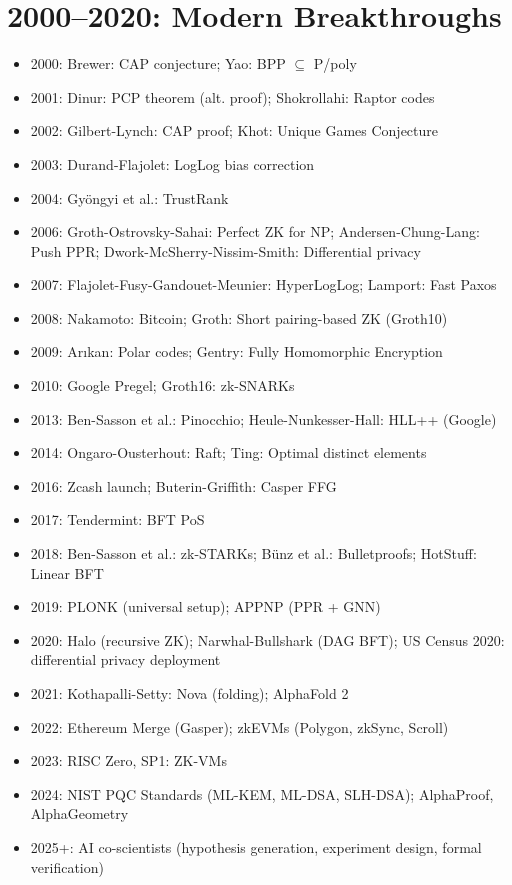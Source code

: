 \section{2000--2020: Modern Breakthroughs}
\begin{itemize}
\item 2000: Brewer: CAP conjecture; Yao: BPP $\subseteq$ P/poly
\item 2001: Dinur: PCP theorem (alt. proof); Shokrollahi: Raptor codes
\item 2002: Gilbert-Lynch: CAP proof; Khot: Unique Games Conjecture
\item 2003: Durand-Flajolet: LogLog bias correction
\item 2004: Gyöngyi et al.: TrustRank
\item 2006: Groth-Ostrovsky-Sahai: Perfect ZK for NP; Andersen-Chung-Lang: Push PPR; Dwork-McSherry-Nissim-Smith: Differential privacy
\item 2007: Flajolet-Fusy-Gandouet-Meunier: HyperLogLog; Lamport: Fast Paxos
\item 2008: Nakamoto: Bitcoin; Groth: Short pairing-based ZK (Groth10)
\item 2009: Arıkan: Polar codes; Gentry: Fully Homomorphic Encryption
\item 2010: Google Pregel; Groth16: zk-SNARKs
\item 2013: Ben-Sasson et al.: Pinocchio; Heule-Nunkesser-Hall: HLL++ (Google)
\item 2014: Ongaro-Ousterhout: Raft; Ting: Optimal distinct elements
\item 2016: Zcash launch; Buterin-Griffith: Casper FFG
\item 2017: Tendermint: BFT PoS
\item 2018: Ben-Sasson et al.: zk-STARKs; Bünz et al.: Bulletproofs; HotStuff: Linear BFT
\item 2019: PLONK (universal setup); APPNP (PPR + GNN)
\item 2020: Halo (recursive ZK); Narwhal-Bullshark (DAG BFT); US Census 2020: differential privacy deployment
\item 2021: Kothapalli-Setty: Nova (folding); AlphaFold 2
\item 2022: Ethereum Merge (Gasper); zkEVMs (Polygon, zkSync, Scroll)
\item 2023: RISC Zero, SP1: ZK-VMs
\item 2024: NIST PQC Standards (ML-KEM, ML-DSA, SLH-DSA); AlphaProof, AlphaGeometry
\item 2025+: AI co-scientists (hypothesis generation, experiment design, formal verification)
\end{itemize}

